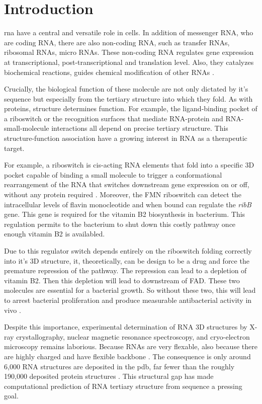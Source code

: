 \documentclass[11pt,a4paper]{article}
\begin{document}
\newpage 
\section{Introduction}

\acrfull{rna} have a central and versatile role in cells. In addition  of messenger RNA, who are coding RNA, there are also non-coding RNA, such as transfer RNAs, ribosomal RNAs, micro RNAs. These non-coding RNA  regulates gene expression at transcriptional, post-transcriptional and translation level. Also, they catalyzes biochemical reactions, guides chemical modification of other RNAs \cite{cech2014noncoding, breaker2012riboswitches}. 

Crucially, the biological function of these molecule are not only dictated by it's sequence but especially from the tertiary structure into which they fold. As with proteins, structure determines function. For example, the ligand-binding pocket of a riboswitch or the recognition surfaces that mediate RNA-protein and RNA-small-molecule interactions all depend on precise tertiary structure. This structure-function association have a growing interest in RNA as a therapeutic target. 

For example, a riboswitch is cis-acting RNA elements that fold into a specific 3D pocket capable of binding a small molecule to trigger a conformational rearrangement of the RNA that switches downstream gene expression on or off, without any protein required \cite{warner2018principles}. Moreover, the FMN riboswitch can detect the intracellular levels of flavin monocleotide and when bound can regulate the \textit{ribB} gene. This gene is required for the vitamin B2 biosynthesis in bacterium. This regulation permits to the bacterium to shut down this costly pathway once enough vitamin B2 is availabled. 

Due to this regulator switch depends entirely on the riboswitch folding correctly into it's 3D structure, it, theoretically, can be design to be a drug and force the premature repression of the pathway. The repression can lead to a depletion of vitamin B2. Then this depletion will lead to downstream of FAD. These two molecules are essential for a bacterial growth. So without these two, this will lead to arrest bacterial proliferation and produce measurable antibacterial activity in vivo \cite{howe2015ribocil}.

Despite this importance, experimental determination of RNA 3D structures by X-ray crystallography, nuclear magnetic resonance spectroscopy, and cryo-electron microscopy remains laborious. Because RNAs are very flexable, also because there are highly charged and have flexible backbone \cite{wang2023trrosettarna}. The consequence is only around 6,000 RNA structures are deposited in the \acrlong{pdb}, far fewer than the roughly 190,000 deposited protein structures \cite{wang2023trrosettarna}. This structural gap has made computational prediction of RNA tertiary structure from sequence a pressing goal.
\end{document}
